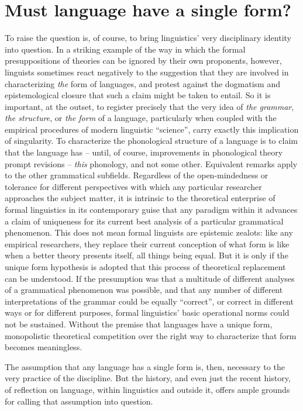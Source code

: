 \documentclass[output=paper]{langscibook}
\begin{document}
\section{Must language have a single form?}
\label{sec:riemer:singleform}

To raise the question is, of course, to bring linguistics' very disciplinary identity into question. In a striking example of the way in which the formal presuppositions of theories can be ignored by their own proponents, however, linguists sometimes react negatively to the suggestion that they are involved in characterizing \emph{the} form of languages, and protest against the dogmatism and epistemological closure that such a claim might be taken to entail. So it is important, at the outset, to register precisely that the very idea of \emph{the grammar}, \emph{the structure}, or \emph{the form} of a language, particularly when coupled with the empirical procedures of modern linguistic ``science'', carry exactly this implication of singularity. To characterize the phonological structure of a language is to claim that the language has – until, of course, improvements in phonological theory prompt revisions – \emph{this} phonology, and not some other. Equivalent remarks apply to the other grammatical subfields. Regardless of the open-mindedness or tolerance for different perspectives with which any particular researcher approaches the subject matter, it is intrinsic to the theoretical enterprise of formal linguistics in its contemporary guise that any paradigm within it advances a claim of uniqueness for its current best analysis of a particular grammatical phenomenon. This does not mean formal linguists are epistemic zealots: like any empirical researchers, they replace their current conception of what form is like when a better theory presents itself, all things being equal. But it is only if the unique form hypothesis is adopted that this process of theoretical replacement can be understood. If the presumption was that a multitude of different analyses of a grammatical phenomenon was possible, and that any number of different interpretations of the grammar could be equally ``correct'', or correct in different ways or for different purposes, formal linguistics' basic operational norms could not be sustained. Without the premise that languages have a unique form, monopolistic theoretical competition over the right way to characterize that form becomes meaningless.

The assumption that any language has a single form is, then, necessary to the very practice of the discipline. But the history, and even just the recent history, of reflection on language, within linguistics and outside it, offers ample grounds for calling that assumption into question.
\end{document}
